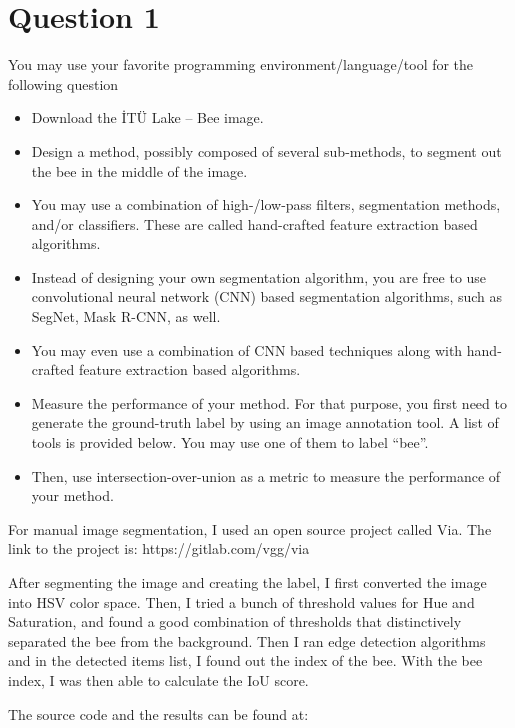 \documentclass[12pt]{article}
\begin{document}
\maketitle

\section{Question 1}\label{sec:q1}
You may use your favorite programming environment/language/tool for the following question
\begin{itemize}
    \item Download the İTÜ Lake – Bee image.
    \item Design a method, possibly composed of several sub-methods, to segment out the bee in the middle of the image.
    \item You may use a combination of high-/low-pass filters, segmentation methods, and/or classifiers. These are called hand-crafted feature extraction based algorithms.
    \item Instead of designing your own segmentation algorithm, you are free to use convolutional neural network (CNN) based segmentation algorithms, such as SegNet, Mask R-CNN, as well. 
    \item You may even use a combination of CNN based techniques along with hand-crafted feature extraction based algorithms. 
    \item Measure the performance of your method. For that purpose, you first need to generate the ground-truth label by using an image annotation tool. A list of tools is provided below. You may use one of them to label “bee”.  
    \item Then, use intersection-over-union as a metric to measure the performance of your method.
\end{itemize}

For manual image segmentation, I used an open source project called Via. The link to the project is: https://gitlab.com/vgg/via

After segmenting the image and creating the label, I first converted the image into HSV color space. Then, I tried a bunch of threshold values for Hue and Saturation, and found a good combination of thresholds that distinctively separated the bee from the background. Then I ran edge detection algorithms and in the detected items list, I found out the index of the bee. With the bee index, I was then able to calculate the IoU score.

The source code and the results can be found at:
\end{document}
